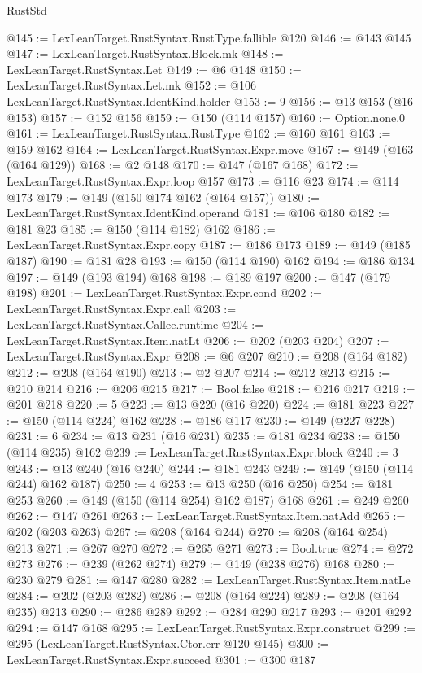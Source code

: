 \begin{lexlean}{RustStd}
\begin{coremodule}
@145 := LexLeanTarget.RustSyntax.RustType.fallible @120
@146 := @143 @145
@147 := LexLeanTarget.RustSyntax.Block.mk
@148 := LexLeanTarget.RustSyntax.Let
@149 := @6 @148
@150 := LexLeanTarget.RustSyntax.Let.mk
@152 := @106 LexLeanTarget.RustSyntax.IdentKind.holder
@153 := 9
@156 := @13 @153 (@16 @153)
@157 := @152 @156
@159 := @150 (@114 @157)
@160 := Option.none.{0}
@161 := LexLeanTarget.RustSyntax.RustType
@162 := @160 @161
@163 := @159 @162
@164 := LexLeanTarget.RustSyntax.Expr.move
@167 := @149 (@163 (@164 @129))
@168 := @2 @148
@170 := @147 (@167 @168)
@172 := LexLeanTarget.RustSyntax.Expr.loop @157
@173 := @116 @23
@174 := @114 @173
@179 := @149 (@150 @174 @162 (@164 @157))
@180 := LexLeanTarget.RustSyntax.IdentKind.operand
@181 := @106 @180
@182 := @181 @23
@185 := @150 (@114 @182) @162
@186 := LexLeanTarget.RustSyntax.Expr.copy
@187 := @186 @173
@189 := @149 (@185 @187)
@190 := @181 @28
@193 := @150 (@114 @190) @162
@194 := @186 @134
@197 := @149 (@193 @194) @168
@198 := @189 @197
@200 := @147 (@179 @198)
@201 := LexLeanTarget.RustSyntax.Expr.cond
@202 := LexLeanTarget.RustSyntax.Expr.call
@203 := LexLeanTarget.RustSyntax.Callee.runtime
@204 := LexLeanTarget.RustSyntax.Item.natLt
@206 := @202 (@203 @204)
@207 := LexLeanTarget.RustSyntax.Expr
@208 := @6 @207
@210 := @208 (@164 @182)
@212 := @208 (@164 @190)
@213 := @2 @207
@214 := @212 @213
@215 := @210 @214
@216 := @206 @215
@217 := Bool.false
@218 := @216 @217
@219 := @201 @218
@220 := 5
@223 := @13 @220 (@16 @220)
@224 := @181 @223
@227 := @150 (@114 @224) @162
@228 := @186 @117
@230 := @149 (@227 @228)
@231 := 6
@234 := @13 @231 (@16 @231)
@235 := @181 @234
@238 := @150 (@114 @235) @162
@239 := LexLeanTarget.RustSyntax.Expr.block
@240 := 3
@243 := @13 @240 (@16 @240)
@244 := @181 @243
@249 := @149 (@150 (@114 @244) @162 @187)
@250 := 4
@253 := @13 @250 (@16 @250)
@254 := @181 @253
@260 := @149 (@150 (@114 @254) @162 @187) @168
@261 := @249 @260
@262 := @147 @261
@263 := LexLeanTarget.RustSyntax.Item.natAdd
@265 := @202 (@203 @263)
@267 := @208 (@164 @244)
@270 := @208 (@164 @254) @213
@271 := @267 @270
@272 := @265 @271
@273 := Bool.true
@274 := @272 @273
@276 := @239 (@262 @274)
@279 := @149 (@238 @276) @168
@280 := @230 @279
@281 := @147 @280
@282 := LexLeanTarget.RustSyntax.Item.natLe
@284 := @202 (@203 @282)
@286 := @208 (@164 @224)
@289 := @208 (@164 @235) @213
@290 := @286 @289
@292 := @284 @290 @217
@293 := @201 @292
@294 := @147 @168
@295 := LexLeanTarget.RustSyntax.Expr.construct
@299 := @295 (LexLeanTarget.RustSyntax.Ctor.err @120 @145)
@300 := LexLeanTarget.RustSyntax.Expr.succeed
@301 := @300 @187

\end{coremodule}
\end{lexlean}
